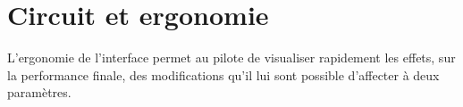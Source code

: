 








\section{Circuit et ergonomie}\label{sec:task-calc-dial}
L'ergonomie de l'interface permet au pilote de visualiser rapidement les effets, sur la performance finale, des modifications qu'il lui sont possible d'affecter à deux paramètres.

